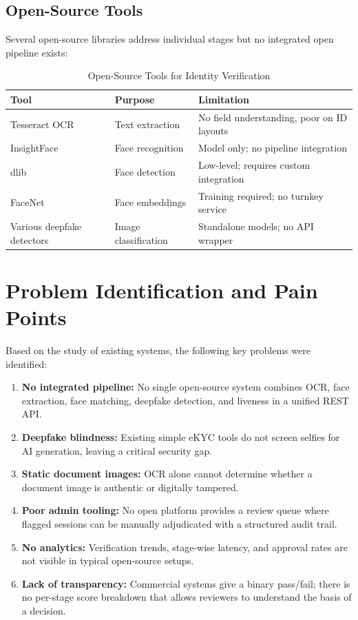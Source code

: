 \documentclass[12pt,a4paper]{report}
\begin{document}
\subsection{Open-Source Tools}

Several open-source libraries address individual stages but no integrated open pipeline exists:

\begin{table}[H]
\centering
\caption{Open-Source Tools for Identity Verification}
\begin{tabular}{@{}lll@{}}
\toprule
\textbf{Tool} & \textbf{Purpose} & \textbf{Limitation} \\
\midrule
Tesseract OCR & Text extraction & No field understanding, poor on ID layouts \\
InsightFace & Face recognition & Model only; no pipeline integration \\
dlib & Face detection & Low-level; requires custom integration \\
FaceNet & Face embeddings & Training required; no turnkey service \\
Various deepfake detectors & Image classification & Standalone models; no API wrapper \\
\bottomrule
\end{tabular}
\end{table}

\section{Problem Identification and Pain Points}

Based on the study of existing systems, the following key problems were identified:

\begin{enumerate}
    \item \textbf{No integrated pipeline:} No single open-source system combines OCR, face extraction, face matching, deepfake detection, and liveness in a unified REST API.
    \item \textbf{Deepfake blindness:} Existing simple eKYC tools do not screen selfies for AI generation, leaving a critical security gap.
    \item \textbf{Static document images:} OCR alone cannot determine whether a document image is authentic or digitally tampered.
    \item \textbf{Poor admin tooling:} No open platform provides a review queue where flagged sessions can be manually adjudicated with a structured audit trail.
    \item \textbf{No analytics:} Verification trends, stage-wise latency, and approval rates are not visible in typical open-source setups.
    \item \textbf{Lack of transparency:} Commercial systems give a binary pass/fail; there is no per-stage score breakdown that allows reviewers to understand the basis of a decision.
\end{enumerate}
\end{document}

